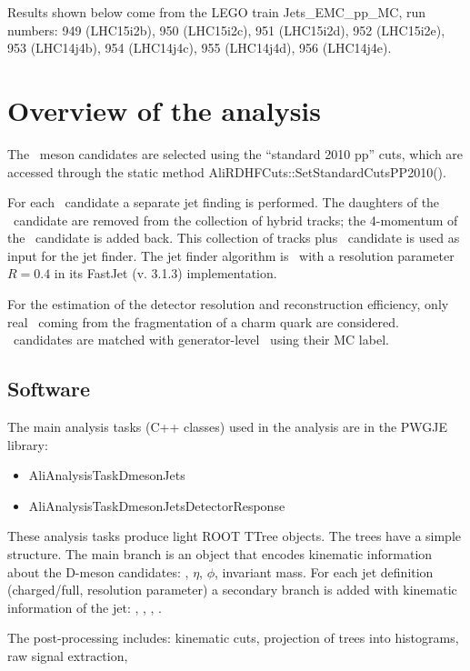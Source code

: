 Results shown below come from the LEGO train Jets\_EMC\_pp\_MC, run numbers: 949 (LHC15i2b), 950 (LHC15i2c), 951 (LHC15i2d), 952 (LHC15i2e), 953 (LHC14j4b), 954 (LHC14j4c), 955 (LHC14j4d), 956 (LHC14j4e).

\section{Overview of the analysis}
The \Dzero\ meson candidates are selected using the ``standard 2010 pp'' cuts, which are accessed through the static method AliRDHFCuts::SetStandardCutsPP2010().

For each \Dzero\ candidate a separate jet finding is performed. The daughters of the \Dzero\ candidate are 
removed from the collection of hybrid tracks; the 4-momentum of the \Dzero\ candidate is added back. 
This collection of tracks plus \Dzero\ candidate is used as input for the jet finder.
The jet finder algorithm is \antikt\ with a resolution parameter $R=0.4$ in its FastJet (v. 3.1.3) implementation.

For the estimation of the detector resolution and reconstruction efficiency, only real \Dzero\ coming from
the fragmentation of a charm quark are considered. \Dzero\ candidates are matched with generator-level \Dzero\ using their MC label.

\subsection{Software}

The main analysis tasks (C++ classes) used in the analysis are in the PWGJE library:
\begin{itemize}
\item AliAnalysisTaskDmesonJets
\item AliAnalysisTaskDmesonJetsDetectorResponse
\end{itemize}



These analysis tasks produce light ROOT TTree objects. The trees have a simple structure. The main branch is an object that encodes kinematic information about the
D-meson candidates: \pt, $\eta$, $\phi$, invariant mass. For each jet definition (charged/full, resolution parameter) a secondary branch is added with kinematic information
of the jet: \ptjet, \etajet, \phijet, \zpar.

The post-processing includes: kinematic cuts, projection of trees into histograms, raw signal extraction, 

